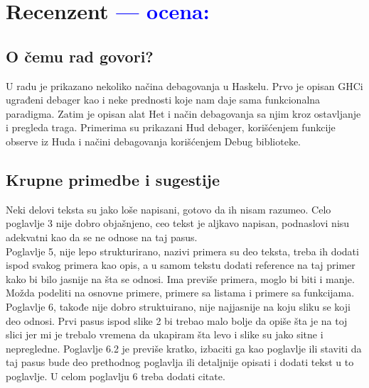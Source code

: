 \documentclass[a4paper]{report}
\newcommand{\odgovor}[1]{\textcolor{blue}{#1}}
\begin{document}
\chapter{Recenzent \odgovor{--- ocena:} }


\section{O čemu rad govori?}
U radu je prikazano nekoliko načina debagovanja u Haskelu. Prvo je opisan GHCi ugrađeni debager kao i neke prednosti koje nam daje sama funkcionalna paradigma. Zatim je opisan alat Het i način debagovanja sa njim kroz ostavljanje i pregleda traga. Primerima su prikazani Hud debager, korišćenjem funkcije observe iz Huda i načini debagovanja korišćenjem Debug biblioteke. 

\section{Krupne primedbe i sugestije}
Neki delovi teksta su jako loše napisani, gotovo da ih nisam razumeo. Celo poglavlje 3 nije dobro objašnjeno, ceo tekst je aljkavo napisan, podnaslovi nisu adekvatni kao da se ne odnose na taj pasus. \\
Poglavlje 5, nije lepo strukturirano, nazivi primera su deo teksta, treba ih dodati ispod svakog primera kao opis, a u samom tekstu dodati reference na taj primer kako bi bilo jasnije na šta se odnosi. Ima previše primera, moglo bi biti i manje. Možda podeliti na osnovne primere, primere sa listama i primere sa funkcijama. \\
Poglavlje 6, takođe nije dobro struktuirano, nije najjasnije na koju sliku se koji deo odnosi. Prvi pasus ispod slike 2 bi trebao malo bolje da opiše šta je na toj slici jer mi je trebalo vremena da ukapiram šta levo i slike su jako sitne i nepregledne. Poglavlje 6.2 je previše kratko, izbaciti ga kao poglavlje ili staviti da taj pasus bude deo prethodnog poglavlja ili detaljnije opisati i dodati tekst u to poglavlje. U celom poglavlju 6 treba dodati citate. 
\end{document}
